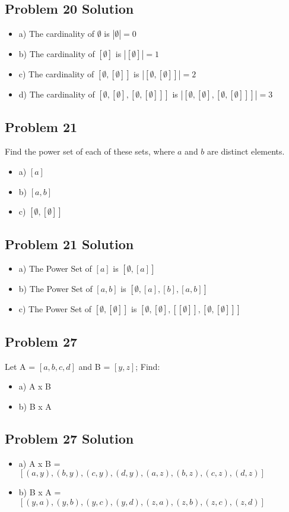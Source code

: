 \documentclass[11pt]{article}
\begin{document}
\subsection{Problem 20 Solution}

\begin{itemize}
\item a) The cardinality of $\emptyset$ is $|\emptyset| = 0$
\item b) The cardinality of $[\emptyset]$ is $|[\emptyset]| = 1$ 
\item c) The cardinality of $[\emptyset, [\emptyset]]$ is $|[\emptyset, [\emptyset]]| = 2$
\item d) The cardinality of $[\emptyset, [\emptyset], [\emptyset, [\emptyset]]]$ is $|[\emptyset, [\emptyset], [\emptyset, [\emptyset]]]| = 3$
\end{itemize}

\subsection{Problem 21}

Find the power set of each of these sets, where $a$ and $b$ are distinct elements.

\begin{itemize}
\item a) $[a]$
\item b) $[a, b]$
\item c) $[\emptyset, [\emptyset]]$
\end{itemize}

\subsection{Problem 21 Solution}

\begin{itemize}
\item a) The Power Set of $[a]$ is $[\emptyset, [a]]$
\item b) The Power Set of $[a, b]$ is $[\emptyset, [a], [b], [a,b]]$
\item c) The Power Set of $[\emptyset, [\emptyset]]$ is $[\emptyset, [\emptyset], [[\emptyset]], [\emptyset, [\emptyset]]]$
\end{itemize}

\subsection{Problem 27}

Let A = $[a, b, c, d]$ and B = $[y, z]$; Find:

\begin{itemize}
\item a) A x B
\item b) B x A
\end{itemize}

\subsection{Problem 27 Solution}

\begin{itemize}
\item a) A x B = $[(a, y), (b, y), (c, y), (d, y), (a, z), (b, z), (c, z), (d, z)]$
\item b) B x A = $[(y, a), (y, b), (y, c), (y, d), (z, a), (z, b), (z, c), (z, d)]$
\end{itemize}
\end{document}
